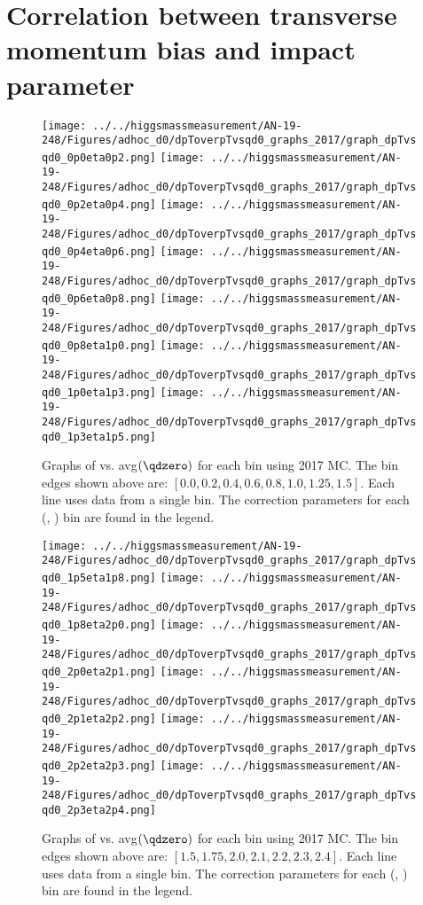 \chapter{Correlation between transverse momentum bias and impact parameter}

\begin{figure}[!htbp]
    \centering
    { \texttt{[image: ../../higgsmassmeasurement/AN-19-248/Figures/adhoc\_d0/dpToverpTvsqd0\_graphs\_2017/graph\_dpTvsqd0\_0p0eta0p2.png]}}
    { \texttt{[image: ../../higgsmassmeasurement/AN-19-248/Figures/adhoc\_d0/dpToverpTvsqd0\_graphs\_2017/graph\_dpTvsqd0\_0p2eta0p4.png]}}
    { \texttt{[image: ../../higgsmassmeasurement/AN-19-248/Figures/adhoc\_d0/dpToverpTvsqd0\_graphs\_2017/graph\_dpTvsqd0\_0p4eta0p6.png]}}
    { \texttt{[image: ../../higgsmassmeasurement/AN-19-248/Figures/adhoc\_d0/dpToverpTvsqd0\_graphs\_2017/graph\_dpTvsqd0\_0p6eta0p8.png]}}
    { \texttt{[image: ../../higgsmassmeasurement/AN-19-248/Figures/adhoc\_d0/dpToverpTvsqd0\_graphs\_2017/graph\_dpTvsqd0\_0p8eta1p0.png]}}
    { \texttt{[image: ../../higgsmassmeasurement/AN-19-248/Figures/adhoc\_d0/dpToverpTvsqd0\_graphs\_2017/graph\_dpTvsqd0\_1p0eta1p3.png]}}
    { \texttt{[image: ../../higgsmassmeasurement/AN-19-248/Figures/adhoc\_d0/dpToverpTvsqd0\_graphs\_2017/graph\_dpTvsqd0\_1p3eta1p5.png]}}
    \caption{ 
        Graphs of \pTmismeas vs. avg$(\qdzero)$ for each \abseta bin using 2017 MC.
        The \abseta bin edges shown above are: $[0.0, 0.2, 0.4, 0.6, 0.8, 1.0, 1.25, 1.5]$.
        Each line uses data from a single \pT bin. 
        The \pT correction parameters for each (\abseta, \pT) bin are found in the legend.
    }
\end{figure}
\newpage
\begin{figure}[!htbp]
    \centering
    { \texttt{[image: ../../higgsmassmeasurement/AN-19-248/Figures/adhoc\_d0/dpToverpTvsqd0\_graphs\_2017/graph\_dpTvsqd0\_1p5eta1p8.png]}}
    { \texttt{[image: ../../higgsmassmeasurement/AN-19-248/Figures/adhoc\_d0/dpToverpTvsqd0\_graphs\_2017/graph\_dpTvsqd0\_1p8eta2p0.png]}}
    { \texttt{[image: ../../higgsmassmeasurement/AN-19-248/Figures/adhoc\_d0/dpToverpTvsqd0\_graphs\_2017/graph\_dpTvsqd0\_2p0eta2p1.png]}}
    { \texttt{[image: ../../higgsmassmeasurement/AN-19-248/Figures/adhoc\_d0/dpToverpTvsqd0\_graphs\_2017/graph\_dpTvsqd0\_2p1eta2p2.png]}}
    { \texttt{[image: ../../higgsmassmeasurement/AN-19-248/Figures/adhoc\_d0/dpToverpTvsqd0\_graphs\_2017/graph\_dpTvsqd0\_2p2eta2p3.png]}}
    { \texttt{[image: ../../higgsmassmeasurement/AN-19-248/Figures/adhoc\_d0/dpToverpTvsqd0\_graphs\_2017/graph\_dpTvsqd0\_2p3eta2p4.png]}}
    \caption{ 
        Graphs of \pTmismeas vs. avg$(\qdzero)$ for each \abseta bin using 2017 MC.
        The \abseta bin edges shown above are: $[1.5, 1.75, 2.0, 2.1, 2.2, 2.3, 2.4]$.
        Each line uses data from a single \pT bin. 
        The \pT correction parameters for each (\abseta, \pT) bin are found in the legend.
    }
\end{figure}
